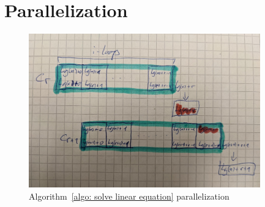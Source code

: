 \section{Parallelization}

\begin{figure}[H]
	\centering
	\includegraphics[width=10cm]{images/algo_2_parallel.jpeg}
	\caption{Algorithm~\ref{algo: solve linear equation} parallelization}
 \end{figure}